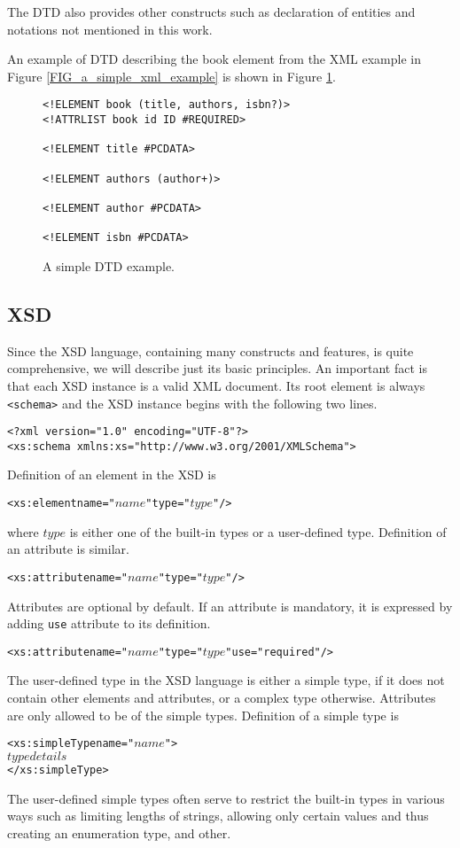 The DTD also provides other constructs such as declaration of entities and notations not mentioned in this work.

An example of DTD describing the book element from the XML example in Figure \ref{FIG_a_simple_xml_example} is shown in Figure \ref{FIG_a_simple_dtd_example}.

\begin{figure}
\begin{verbatim}
<!ELEMENT book (title, authors, isbn?)>
<!ATTRLIST book id ID #REQUIRED>

<!ELEMENT title #PCDATA>

<!ELEMENT authors (author+)>

<!ELEMENT author #PCDATA>

<!ELEMENT isbn #PCDATA>
\end{verbatim}
\caption{A simple DTD example.}
\label{FIG_a_simple_dtd_example}
\end{figure}

\subsection{XSD}
Since the XSD language, containing many constructs and features, is quite comprehensive, we will describe just its basic principles. An important fact is that each XSD instance is a valid XML document. Its root element is always \texttt{<schema>} and the XSD instance begins with the following two lines.

\begin{verbatim}
<?xml version="1.0" encoding="UTF-8"?>
<xs:schema xmlns:xs="http://www.w3.org/2001/XMLSchema">
\end{verbatim}

Definition of an element in the XSD is
\begin{alltt}
<xs:element name="\(name\)" type="\(type\)"/>
\end{alltt}
where $type$ is either one of the built-in types or a user-defined type. Definition of an attribute is similar.
\begin{alltt}
<xs:attribute name="\(name\)" type="\(type\)"/>
\end{alltt}
Attributes are optional by default. If an attribute is mandatory, it is expressed by adding \texttt{use} attribute to its definition.
\begin{alltt}
<xs:attribute name="\(name\)" type="\(type\)" use="required"/>
\end{alltt}

The user-defined type in the XSD language is either a simple type, if it does not contain other elements and attributes, or a complex type otherwise. Attributes are only allowed to be of the simple types. Definition of a simple type is
\begin{alltt}
<xs:simpleType name="\(name\)">
   \(type details\)
</xs:simpleType>
\end{alltt}
The user-defined simple types often serve to restrict the built-in types in various ways such as limiting lengths of strings, allowing only certain values and thus creating an enumeration type, and other.

